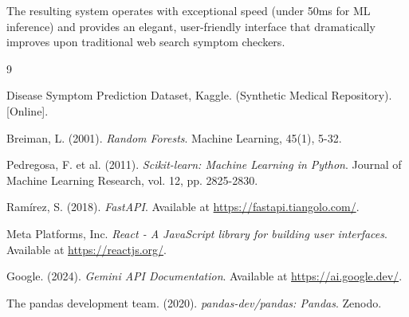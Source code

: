 \documentclass[12pt,a4paper]{report}
\begin{document}
The resulting system operates with exceptional speed (under 50ms for ML inference) and provides an elegant, user-friendly interface that dramatically improves upon traditional web search symptom checkers.

\begin{thebibliography}{9}

Disease Symptom Prediction Dataset, Kaggle. (Synthetic Medical Repository). [Online].

Breiman, L. (2001). \textit{Random Forests}. Machine Learning, 45(1), 5-32.

Pedregosa, F. et al. (2011). \textit{Scikit-learn: Machine Learning in Python}. Journal of Machine Learning Research, vol. 12, pp. 2825-2830.

Ramírez, S. (2018). \textit{FastAPI}. Available at \url{https://fastapi.tiangolo.com/}.

Meta Platforms, Inc. \textit{React - A JavaScript library for building user interfaces}. Available at \url{https://reactjs.org/}.

Google. (2024). \textit{Gemini API Documentation}. Available at \url{https://ai.google.dev/}.

The pandas development team. (2020). \textit{pandas-dev/pandas: Pandas}. Zenodo.

\end{thebibliography}
\end{document}
